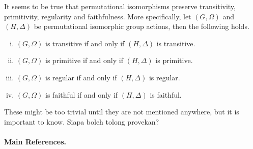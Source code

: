 \begin{remark}
It seems to be true that permutational isomorphisms preserve transitivity, primitivity, regularity and faithfulness. More specifically, let $(G,\Omega)$ and $(H,\Delta)$ be permutational isomorphic group actions, then  the following holds.
\begin{enumerate}[(i)]
	\item $(G,\Omega)$ is transitive if and only if $(H,\Delta)$ is transitive.
	\item $(G,\Omega)$ is primitive if and only if $(H,\Delta)$ is primitive.
	\item $(G,\Omega)$ is regular if and only if $(H,\Delta)$ is regular.
	\item $(G,\Omega)$ is faithful if and only if $(H,\Delta)$ is faithful.
\end{enumerate}
These might be too trivial until they are not mentioned anywhere, but it is important to know. Siapa boleh tolong provekan?
\end{remark}

\paragraph{Main References.} \cite{Praeger2018,Dixon1996,Cameron1999,Jacobson1985}